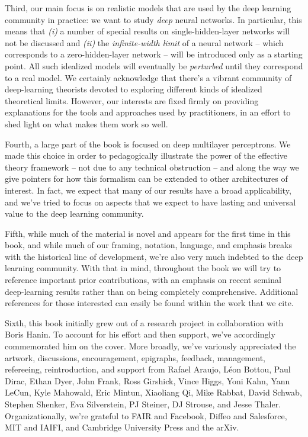 Third, our main focus is on realistic models that are used  by the deep learning community in practice:
we want to study \emph{deep} neural networks. In particular, this means that
\emph{(i)}
a number of special results on single-hidden-layer networks will not be discussed and
\emph{(ii)}
the \emph{infinite-width limit} of a neural network 
-- which corresponds to a zero-hidden-layer network --
will be introduced only as a starting point. All such idealized models will eventually be \emph{perturbed} until they correspond to a real model.
We certainly acknowledge that there's a vibrant community of deep-learning theorists devoted to exploring different kinds of idealized theoretical limits.
However, our interests are fixed firmly on providing explanations for the tools and approaches used by practitioners, 
in an effort to shed light on what
makes them work so well.

Fourth, a large part of the book is focused on deep multilayer perceptrons. We made this choice in order to pedagogically illustrate the power of the effective theory framework --  not due to any technical obstruction -- and along the way we give pointers for how this formalism can be extended to other architectures of interest. In fact, we expect that many of our results have a broad applicability, and we've tried to focus on aspects that we expect to have lasting and universal value to the deep learning community.





Fifth, while much of the material is novel and appears for the first time in this book, and while much of our framing, notation, language, and emphasis breaks with the historical line of development, we're also very much indebted to the deep learning community. 
With that in mind, throughout the book 
we will try to reference important prior contributions, with an emphasis on recent seminal deep-learning results rather than on being completely comprehensive. Additional references for those interested can easily be found within the work that we cite.



Sixth, this book initially 
grew out of a research project in collaboration with Boris Hanin.
To account for his effort and then support,
we've accordingly commemorated him on the cover. More broadly, we've variously appreciated the
artwork,
discussions, 
encouragement,
epigraphs, %
feedback,
management,
refereeing,
reintroduction,
and support
from Rafael Araujo, L\'{e}on Bottou, Paul Dirac, Ethan Dyer, John Frank, Ross Girshick, 
Vince Higgs, Yoni Kahn, Yann LeCun, Kyle Mahowald, Eric Mintun, Xiaoliang Qi, Mike Rabbat, David Schwab, Stephen Shenker, Eva Silverstein, PJ Steiner, DJ Strouse, 
and Jesse Thaler. Organizationally, we're grateful to FAIR and Facebook, Diffeo and Salesforce, MIT and IAIFI, and Cambridge University Press and the arXiv. %



